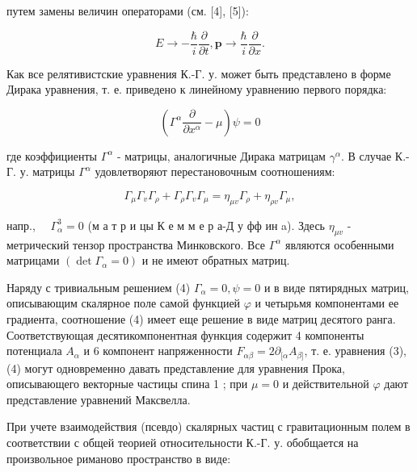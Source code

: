 \documentclass[10pt]{article}
\begin{document}
путем замены величин операторами (см. [4], [5]):



\[

E \rightarrow-\frac{\hbar}{i} \frac{\partial}{\partial t}, \boldsymbol{p} \rightarrow \frac{\hbar}{i} \frac{\partial}{\partial x} .

\]



Как все релятивистские уравнения К.-Г. у. может быть представлено в форме Дирака уравнения, т. е. приведено к линейному уравнению первого порядка:



\[

\left(\Gamma^{\alpha} \frac{\partial}{\partial x^{\alpha}}-\mu\right) \psi=0

\]



где коэффициенты $\Gamma^{\alpha}$ - матрицы, аналогичные Дирака матрицам $\gamma^{\alpha}$. В случае К.-Г. у. матрицы $\Gamma^{\alpha}$ удовлетворяют перестановочным соотношениям:



\[

\Gamma_{\mu} \Gamma_{v} \Gamma_{\rho}+\Gamma_{\rho} \Gamma_{v} \Gamma_{\mu}=\eta_{\mu v} \Gamma_{\rho}+\eta_{\rho v} \Gamma_{\mu},

\]



напр., $\quad \Gamma_{\alpha}^{3}=0$ (м а т р и цы К е м м е р а-Д у фф ин a). Здесь $\eta_{\mu v}$ - метрический тензор пространства Минковского. Все $\Gamma^{\alpha}$ являются особенными матрицами $\left(\operatorname{det} \Gamma_{\alpha}=0\right)$ и не имеют обратных матриц.



Наряду с тривиальным решением (4) $\Gamma_{\alpha}=0, \psi=0$ и в виде пятирядных матриц, описывающим скалярное поле самой функцией $\varphi$ и четырьмя компонентами ее градиента, соотношение (4) имеет еще решение в виде матриц десятого ранга. Соответствующая десятикомпонентная функция содержит 4 компоненты потенциала $A_{\alpha}$ и 6 компонент напряженности $F_{\alpha \beta}=2 \partial_{[\alpha} A_{\beta]}$, т. е. уравнения (3), (4) могут одновременно давать представление для уравнения Прока, описывающего векторные частицы спина 1 ; при $\mu=0$ и действительной $\varphi$ дают представление уравнений Максвелла.



При учете взаимодействия (псевдо) скалярных частиц с гравитационным полем в соответствии с общей теорией относительности К.-Г. у. обобщается на произвольное риманово пространство в виде:
\end{document}
